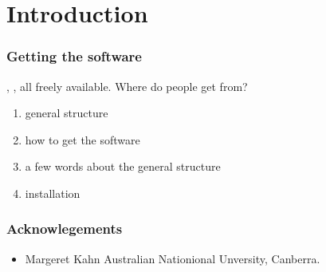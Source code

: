 

\chapter{Introduction}
\label{INTRO}

\subsection{Getting the software}


\escript, \ESyS, all freely available.  Where do people get \finley from?



\begin{enumerate}
 \item general structure 
 \item how to get the software
 \item a few words about the general structure
\item installation
\end{enumerate}

\subsection{Acknowlegements}
\begin{itemize}
\item Margeret Kahn Australian Nationional Unversity, Canberra.
\end{itemize}
